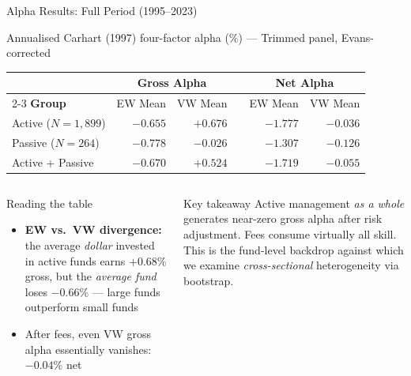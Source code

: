 \documentclass[aspectratio=169,10pt]{beamer}
\begin{document}
\begin{frame}{Alpha Results: Full Period (1995--2023)}
\begin{center}
{\small Annualised Carhart (1997) four-factor alpha (\%) --- Trimmed panel, Evans-corrected}
\vspace{6pt}

\setlength{\tabcolsep}{8pt}
\begin{tabular}{lrr rr r}
\toprule
& \multicolumn{2}{c}{\textbf{Gross Alpha}} && \multicolumn{2}{c}{\textbf{Net Alpha}}\\
\cmidrule{2-3}\cmidrule{5-6}
\textbf{Group} & EW Mean & VW Mean && EW Mean & VW Mean\\
\midrule
Active ($N=1{,}899$) & $-0.655$ & $\mathbf{+0.676}$ && $-1.777$ & $-0.036$ \\
Passive ($N=264$)    & $-0.778$ & $-0.026$ && $-1.307$ & $-0.126$ \\
Active + Passive     & $-0.670$ & $+0.524$ && $-1.719$ & $-0.055$ \\
\bottomrule
\end{tabular}
\end{center}
\vspace{4pt}

\begin{columns}[T]
\begin{block}{Reading the table}
\begin{itemize}
  \item \textbf{EW vs.\ VW divergence:} the average \emph{dollar} invested in active funds earns $+0.68\%$ gross, but the \emph{average fund} loses $-0.66\%$ — large funds outperform small funds
  \item After fees, even VW gross alpha essentially vanishes: $-0.04\%$ net
\end{itemize}
\end{block}

\begin{alertblock}{Key takeaway}
Active management \emph{as a whole} generates near-zero gross alpha after risk adjustment. Fees consume virtually all skill. This is the fund-level backdrop against which we examine \emph{cross-sectional} heterogeneity via bootstrap.
\end{alertblock}
\end{columns}
\end{frame}
\end{document}
